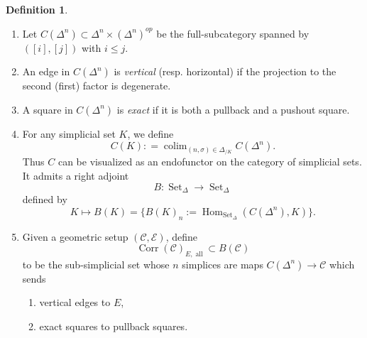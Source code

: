 \documentclass[14pt]{article}
\theoremstyle{definition}
\newtheorem{definition}[theorem]{Definition}
\newcommand{\E}{\mathcal{E}}
\newcommand{\op}[1]{\operatorname{#1}}
\newcommand{\Ca}{\mathcal{C}}
\numberwithin{subsection}{section}
\newcommand{\sset}{\op{Set}_{\Delta}}
\begin{document}
    \begin{definition}\cite[Definition A.5.2]{mann2022padic}
        \begin{enumerate}
            \item Let $C(\Delta^n) \subset \Delta^n \times (\Delta^n)^{op}$ be the full-subcategory spanned by $([i],[j])$ with $i \le j$.
            \item An edge in $C(\Delta^n)$ is \textit{vertical} (resp. horizontal) if the projection to the second (first) factor is degenerate.
            \item A square in $C(\Delta^n)$ is \textit{exact} if it is both a pullback and a pushout square.
            \item For any simplicial set $K$, we define 
            \begin{equation*}
                C(K): = \op{colim}_{(n,\sigma) \in \Delta_{/K}}C(\Delta^n).
            \end{equation*}
            Thus $C$ can be visualized as an endofunctor on the category of simplicial sets. It admits a right adjoint 
            \begin{equation*}
                B: \sset \to \sset
            \end{equation*}
            defined by 
            \begin{equation*}
                K \mapsto B(K) =\{B(K)_n:= \op{Hom}_{\sset}(C(\Delta^n),K) \}.
            \end{equation*}
            \item Given a geometric setup $(\Ca,\E)$, define 
            \begin{equation*}
                \op{Corr}(\Ca)_{E,\op{all}} \subset B(\Ca)
            \end{equation*}
            to be the sub-simplicial set whose $n$ simplices are maps $C(\Delta^n) \to \Ca$ which sends 
            \begin{enumerate}
                \item vertical edges to $E$,
                \item exact squares to pullback squares.
            \end{enumerate}
        \end{enumerate}
    \end{definition}
 
\end{document}
